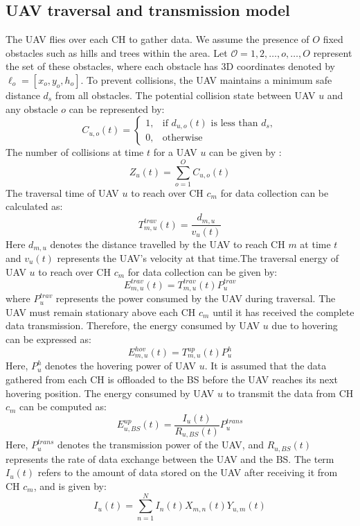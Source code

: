 \documentclass[conference]{IEEEtran}
\begin{document}
\subsection{UAV traversal and transmission model}
The UAV flies over each CH to gather data. We assume the presence of $O$ fixed obstacles such as hills and trees within the area. Let $\mathcal{O} = {1, 2, \ldots, o, \ldots, O}$ represent the set of these obstacles, where each obstacle has 3D coordinates denoted by $\ell_o = [x_o, y_o, h_o]$. To prevent collisions, the UAV maintains a minimum safe distance $d_s$ from all obstacles. The potential collision state between UAV $u$ and any obstacle $o$ can be represented by:
\begin{equation}\label{binary-v3} 
    C_{u,o}(t) = 
    \begin{cases}
        1, & \mbox{if $d_{u,o}(t)$ is less than $d_s$} ,\\ 
        0, & \mbox{otherwise}
    \end{cases}
\end{equation}
The number of collisions at time $t$ for a UAV $u$ can be given by :
\begin{equation}
    Z_u(t) = \sum_{o=1}^O C_{u,o}(t)  
\end{equation}
The traversal time of UAV $u$ to reach over CH $c_m$ for data collection can be calculated as:
\begin{equation}
    T_{m,u}^{trav}(t) = \frac{d_{m,u}}{v_u(t)} 
\end{equation}
Here $d_{m,u}$ denotes the distance travelled by the UAV to reach CH $m$ at time $t$ and $v_u(t)$ represents the UAV's velocity at that time.The traversal energy of UAV $u$ to reach over CH $c_m$ for data collection can be given by:
\begin{equation}
    E_{m,u}^{trav}(t) =  T_{m,u}^{trav}(t) P_{u}^{trav}
\end{equation}
where $P_{u}^{trav}$ represents the power consumed by the UAV during traversal.
The UAV must remain stationary above each CH $c_m$ until it has received the complete data transmission. Therefore, the energy consumed by UAV $u$ due to hovering can be expressed as:
\begin{equation}
    E_{m,u}^{hov}(t) =  T_{m,u}^{up}(t) P_{u}^{h}
\end{equation}
Here, $P_{u}^h$ denotes the hovering power of UAV $u$. It is assumed that the data gathered from each CH is offloaded to the BS before the UAV reaches its next hovering position. The energy consumed by UAV $u$ to transmit the data from CH $c_m$ can be computed as:
\begin{equation}
    E_{u,BS}^{up}(t) = \frac{I_u(t)}{R_{u,BS}(t)} P_u^{trans}
\end{equation}
Here, $P_u^{trans}$ denotes the transmission power of the UAV, and $R_{u,BS}(t)$ represents the rate of data exchange between the UAV and the BS. The term $I_u(t)$ refers to the amount of data stored on the UAV after receiving it from CH $c_m$, and is given by:
\begin{equation}
    I_u(t) = \sum_{n=1}^{N}I_n(t)X_{m,n}(t)Y_{u,m}(t)
\end{equation}
\end{document}
